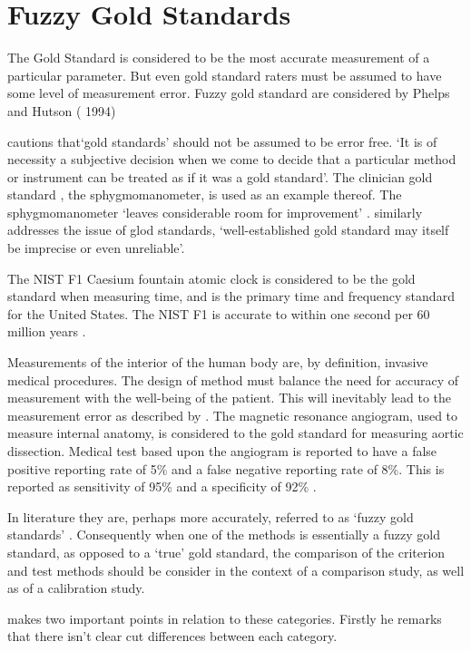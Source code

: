 \documentclass[12pt, a4paper]{report}
\theoremstyle{plain}
\theoremstyle{definition}
\theoremstyle{remark}
\begin{document}
	\section{Fuzzy Gold Standards} The Gold Standard is considered to be the most
	accurate measurement of a particular parameter. But even gold
	standard raters must be assumed to have some level of measurement
	error. Fuzzy gold standard are considered by Phelps and Hutson (
	1994)
	
\citet[p.47]{DunnSEME} cautions that`gold standards' should not be
assumed to be error free. `It is of necessity a subjective
decision when we come to decide that a particular method or
instrument can be treated as if it was a gold standard'. The
clinician gold standard , the sphygmomanometer, is used as an
example thereof.  The sphygmomanometer `leaves considerable room
for improvement' \citep{DunnSEME}. \citet{pizzi} similarly
addresses the issue of glod standards, `well-established gold
standard may itself be imprecise or even unreliable'.


The NIST F1 Caesium fountain atomic clock is considered to be the
gold standard when measuring time, and is the primary time and
frequency standard for the United States. The NIST F1 is accurate
to within one second per 60 million years \citep{NIST}.

Measurements of the interior of the human body are, by definition,
invasive medical procedures. The design of method must balance the
need for accuracy of measurement with the well-being of the
patient. This will inevitably lead to the measurement error as
described by \citet{DunnSEME}. The magnetic resonance angiogram,
used to measure internal anatomy,  is considered to the gold
standard for measuring aortic dissection. Medical test based upon
the angiogram is reported to have a false positive reporting rate
of 5\% and a false negative reporting rate of 8\%. This is
reported as sensitivity of 95\% and a specificity of 92\%
\citep{ACR}.

In literature they are, perhaps more accurately, referred to as
`fuzzy gold standards' \citep{phelps}. Consequently when one of the methods is
essentially a fuzzy gold standard, as opposed to a `true' gold
standard, the comparison of the criterion and test methods should
be consider in the context of a comparison study, as well as of a
calibration study.


	
	
	
	\citet{DunnSEME} makes two important points in relation to these
	categories. Firstly he remarks that there isn't clear cut differences between each category.
	
\end{document}
